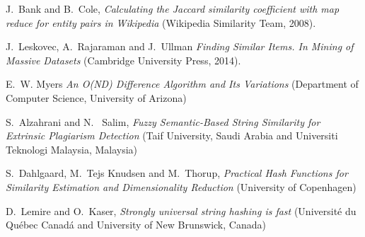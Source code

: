 \documentclass[12pt]{article}
\begin{document}
\begin{thebibliography}{100}

J.\ Bank and B.\ Cole,
\textit {Calculating the Jaccard similarity coefficient with map reduce for entity pairs in
Wikipedia} (Wikipedia Similarity Team, 2008).

J.\ Leskovec, A.\ Rajaraman and J.\ Ullman
\textit{ Finding Similar Items. In Mining of Massive Datasets} (Cambridge University Press, 2014).

E.\ W. Myers \textit{An O(ND) Difference Algorithm and Its Variations} (Department of Computer Science, University of Arizona)

S.\ Alzahrani and N. \ Salim, \textit{Fuzzy Semantic-Based String Similarity for Extrinsic Plagiarism Detection} (Taif University, Saudi Arabia and Universiti Teknologi Malaysia, Malaysia)

S.\ Dahlgaard, M.\ Tejs Knudsen and M.\ Thorup, \textit{Practical Hash Functions for Similarity Estimation and Dimensionality Reduction} (University of Copenhagen)

D.\ Lemire and O.\ Kaser, \textit{Strongly universal string hashing is fast} (Université du Québec Canadá and University of New Brunswick, Canada) 
\end{thebibliography}
\end{document}
